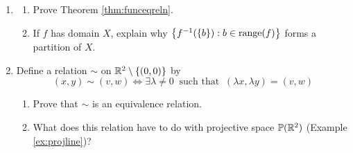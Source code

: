 \begin{exercises}{}{}
\begin{enumerate}
	
	

	
	
	\item\begin{enumerate}
	  \item Prove Theorem \ref{thm:funceqreln}.
	  \item If $f$ has domain $X$, explain why $\bigl\{f^{-1}(\{b\}):b\in\operatorname{range}(f)\bigr\}$ forms a partition of $X$.
	\end{enumerate}
	
  
		\item Define a relation $\sim$ on $\mathbb{R}^2\setminus\{(0,0)\}$ by
	\[
		(x,y)\sim (v,w)\iff \exists\lambda\neq 0\ \text{ such that }\ (\lambda x,\lambda y)=(v,w)
	\]
	\begin{enumerate}
	  \item Prove that $\sim$ is an equivalence relation.
	  \item What does this relation have to do with projective space $\mathbb{P}(\mathbb{R}^2)$ (Example \ref{ex:projline})?
	\end{enumerate}
  
	

\end{enumerate}
\end{exercises}
